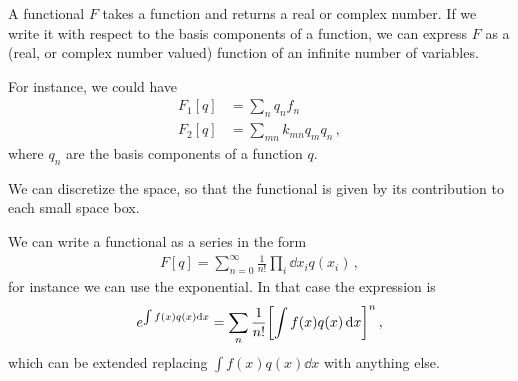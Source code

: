 \documentclass[main.tex]{subfiles}
\begin{document}
A functional \(F\) takes a function and returns a real or complex number. If we write it with respect to the basis components of a function, we can express \(F\) as a (real, or complex number valued) function of an infinite number of variables. 

For instance, we could have 
%
\begin{subequations}
\begin{align}
F_1 [q] &= \sum _{n} q_n f_n  \\
F_2 [q] &= \sum _{mn} k_{mn} q_m q_n
\,,
\end{align}
\end{subequations}
%
where \(q_n\) are the basis components of a function \(q\). 

We can discretize the space, so that the functional is given by its contribution to each small space box. 

We can write a functional as a series in the form 
%
\begin{align}
F[q] = \sum _{n=0}^{ \infty } \frac{1}{n!} \prod_i \dd{x_{i}} q(x_i)
\,,
\end{align}
%
for instance we can use the exponential. In that case the expression is 
%
\begin{align}
e^{\int f(x)q(x) \dd{x}}
= \sum _{n} \frac{1}{n!} \qty[\int f(x) q(x) \dd{x}]^{n}
\,,
\end{align}
%
which can be extended replacing \(\int f(x) q(x) \dd{x}\) with anything else. 
\end{document}
